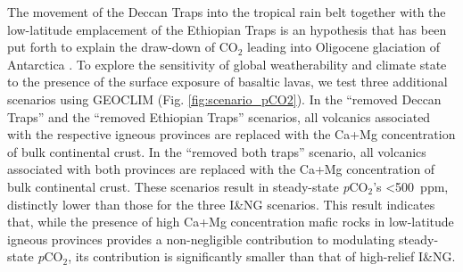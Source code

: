 \documentclass[11pt,letterpaper]{article}
\newcommand{\pCOtwo}{\textit{p}CO$_{2}$\xspace}
\newcommand{\COtwo}{CO$_{2}$\xspace}
\begin{document}
The movement of the Deccan Traps into the tropical rain belt together with the low-latitude emplacement of the Ethiopian Traps is an hypothesis that has been put forth to explain the draw-down of \COtwo leading into Oligocene glaciation of Antarctica \citep{Kent2008a, Kent2013a}. To explore the sensitivity of global weatherability and climate state to the presence of the surface exposure of basaltic lavas, we test three additional scenarios using GEOCLIM (Fig. \ref{fig:scenario_pCO2}). In the ``removed Deccan Traps'' and the ``removed Ethiopian Traps'' scenarios, all volcanics associated with the respective igneous provinces are replaced with the Ca+Mg concentration of bulk continental crust. In the ``removed both traps'' scenario, all volcanics associated with both provinces are replaced with the Ca+Mg concentration of bulk continental crust. These scenarios result in steady-state \pCOtwo's \textless500~ppm, distinctly lower than those for the three I\&NG scenarios. This result indicates that, while the presence of high Ca+Mg concentration mafic rocks in low-latitude igneous provinces provides a non-negligible contribution to modulating steady-state \pCOtwo, its contribution is significantly smaller than that of high-relief I\&NG.
\end{document}
